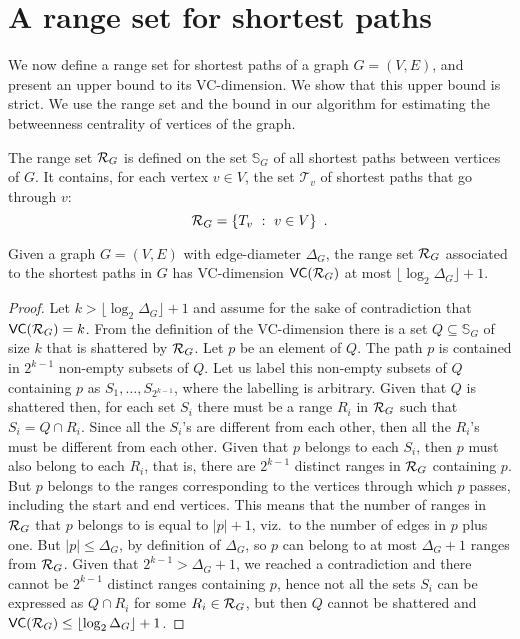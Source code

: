 \section{A range set for shortest paths}\label{sec:rangeset}
We now define a range set for shortest paths of a graph $G=(V,E)$, and present 
an upper bound to its VC-dimension. We show that this upper bound is strict. We
use the range set and the bound in our algorithm for estimating the betweenness
centrality of vertices of the graph.

The range set $\mathcal{R}_G$ is defined on the set $\mathbb{S}_G$ of all shortest
paths between vertices of $G$. It contains, for each vertex $v\in V$, the set
$\mathcal{T}_v$  of shortest paths that go through $v$:
\[
\mathcal{R}_G = \{T_v ~:~ v\in V\}\enspace.
\]

\begin{lemma}\label{lem:vcdimuppbound}
  Given a graph $G=(V,E)$ with edge-diameter $\Delta_G$, the range set
  $\mathcal{R}_G$ associated to the shortest paths in $G$ has VC-dimension
  $\mathsf{VC}(\mathcal{R}_G)$ at most $\lfloor\log_2\Delta_G\rfloor+1$.
\end{lemma}

\begin{proof}
Let $k>\lfloor\log_2\Delta_G\rfloor+1$ and assume for the sake of contradiction
that $\mathsf{VC}(\mathcal{R}_G)=k$. From the definition of the VC-dimension there is a set
$Q\subseteq\mathbb{S}_G$ of size $k$ that is shattered by $\mathcal{R}_G$. Let $p$ be
an element of $Q$. The path $p$ is contained in $2^{k-1}$ non-empty subsets of
$Q$. Let us label this non-empty subsets of $Q$ containing $p$ as
$S_1,\dotsc,S_{2^{k-1}}$, where the labelling is arbitrary.
Given that $Q$ is shattered then, for each set $S_i$ there must be a range $R_i$ in
$\mathcal{R}_G$ such that $S_i=Q\cap R_i$. Since all the $S_i$'s are
different from each other, then all the $R_i$'s must be different from each
other. Given that $p$ belongs to each $S_i$, then $p$ must also belong to each
$R_i$, that is, there are $2^{k-1}$ distinct ranges in $\mathcal{R}_G$ containing
$p$. But $p$ belongs to the ranges corresponding to the vertices through which $p$
passes, including the start and end vertices. This means that the number of ranges
in $\mathcal{R}_G$ that $p$ belongs to is equal to $|p|+1$, viz.~to the number of
edges in $p$ plus one. But $|p|\le\Delta_G$, by definition of $\Delta_G$, so $p$
can belong to at most $\Delta_G+1$ ranges from $\mathcal{R}_G$. Given that
$2^{k-1}>\Delta_G+1$, we reached a contradiction and there cannot be $2^{k-1}$
distinct ranges containing $p$, hence not all the sets $S_i$ can be expressed as
$Q\cap R_i$ for some $R_i\in\mathcal{R}_G$, but then $Q$ cannot be shattered and
$\mathsf{VC}(\mathcal{R}_G)\le\lfloor\log_2\Delta_G\rfloor+1$.%
\end{proof}

